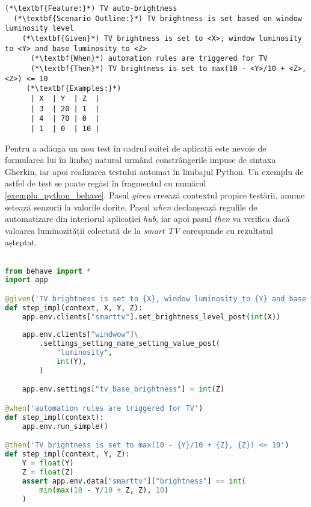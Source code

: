 \begin{lstlisting}[caption={Exemplu de scenariu de test BDD pentru aplicațiile din suită}, label={exemplu_bdd}]
(*\textbf{Feature:}*) TV auto-brightness
  (*\textbf{Scenario Outline:}*) TV brightness is set based on window luminosity level
    (*\textbf{Given}*) TV brightness is set to <X>, window luminosity to <Y> and base luminosity to <Z>
      (*\textbf{When}*) automation rules are triggered for TV
      (*\textbf{Then}*) TV brightness is set to max(10 - <Y>/10 + <Z>, <Z>) <= 10
     (*\textbf{Examples:}*)
      | X  | Y  | Z  |
      | 3  | 20 | 1  |
      | 4  | 70 | 0  |
      | 1  | 0  | 10 |
\end{lstlisting}

Pentru a adăuga un nou test în cadrul suitei de aplicații este nevoie de formularea lui în limbaj natural urmând constrângerile impuse de sintaxa Gherkin, iar apoi realizarea testului automat în limbajul Python. Un exemplu de astfel de test se poate regăsi în fragmentul cu numărul \ref{exemplu_python_behave}. Pasul \textit{given} creează contextul propice testării, anume setează senzorii la valorile dorite. Pasul \textit{when} declanșează regulile de automatizare din interiorul aplicației \textit{hub}, iar apoi pasul \textit{then} va verifica dacă valoarea luminozității colectată de la \textit{smart TV} corespunde cu rezultatul așteptat.

\begin{lstlisting}[caption={Exemplu test automat folosind biblioteca Behave}, label={exemplu_python_behave}, language={Python}]

from behave import *
import app

@given('TV brightness is set to {X}, window luminosity to {Y} and base luminosity to {Z}')
def step_impl(context, X, Y, Z):
    app.env.clients["smarttv"].set_brightness_level_post(int(X))
    
    app.env.clients["windwow"]\
        .settings_setting_name_setting_value_post(
            "luminosity", 
            int(Y),
        )

    app.env.settings["tv_base_brightness"] = int(Z)

@when('automation rules are triggered for TV')
def step_impl(context):
    app.env.run_simple()

@then('TV brightness is set to max(10 - {Y}/10 + {Z}, {Z}) <= 10')
def step_impl(context, Y, Z):
    Y = float(Y)
    Z = float(Z)
    assert app.env.data["smarttv"]["brightness"] == int(
        min(max(10 - Y/10 + Z, Z), 10)
    )
\end{lstlisting}

